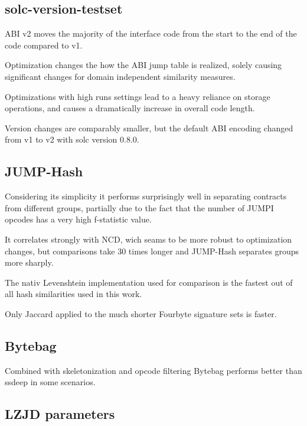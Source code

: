\documentclass[../main.tex]{subfiles}
\begin{document}

\subsection{solc-version-testset}
ABI v2 moves the majority of the interface code from the start to the end of the code compared to v1.

Optimization changes the how the ABI jump table is realized, solely causing significant changes for domain independent similarity measures.

Optimizations with high runs settings lead to a heavy reliance on storage operations, and causes a dramatically increase in overall code length.

Version changes are comparably smaller, but the default ABI encoding changed from v1 to v2 with solc version 0.8.0.


\subsection{JUMP-Hash}
Considering its simplicity it performs surprisingly well in separating contracts from different groups, partially due to the fact that the number of JUMPI opcodes has a very high f-statistic value.

It correlates strongly with NCD, wich seams to be more robust to optimization changes, but comparisons take 30 times longer and JUMP-Hash separates groups more sharply.


The nativ Levenshtein implementation used for comparison is the fastest out of all hash similarities used in this work.

Only Jaccard applied to the much shorter Fourbyte signature sets is faster.


\subsection{Bytebag}
Combined with skeletonization and opcode filtering Bytebag performs better than ssdeep in some scenarios.

\subsection{LZJD parameters}
\end{document}
